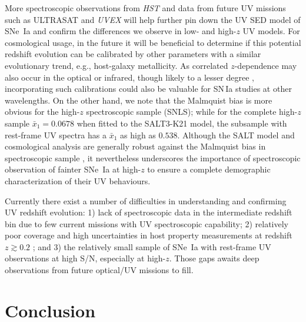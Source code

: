 \documentclass[twocolumn,tighten,times,floatfix]{aastex631}
\begin{document}
More spectroscopic observations from {\it HST} and data from future UV missions such as ULTRASAT and {\it UVEX} will help further pin down the UV SED model of SNe~Ia and confirm the differences we observe in low- and high-$z$ UV models. 
For cosmological usage, in the future it will be beneficial to determine if this potential redshift evolution can be calibrated by other parameters with a similar evolutionary trend, e.g., host-galaxy metallicity. As correlated $z$-dependence may also occur in the optical or infrared, though likely to a lesser degree \citep{Pierel24b, Pierel25}, incorporating such calibrations could also be valuable for SN\,Ia studies at other wavelengths.
On the other hand, we note that the Malmquist bias is more obvious for the high-$z$ spectroscopic sample (SNLS); while for the complete high-$z$ sample $\bar x_1=0.0678$ when fitted to the SALT3-K21 model, the subsample with rest-frame UV spectra has a $\bar x_1$ as high as $0.538$. 
Although the SALT model and cosmological analysis are generally robust against the Malmquist bias in spectroscopic sample \citep{Rubin16, Nicolas21, Ruppin25}, it nevertheless underscores the importance of spectroscopic observation of fainter SNe~Ia at high-$z$ to ensure a complete demographic characterization of their UV behaviours.



Currently there exist a number of difficulties in understanding and confirming UV redshift evolution: 1) lack of spectroscopic data in the intermediate redshift bin due to few current missions with UV spectroscopic capability; 2) relatively poor coverage and high uncertainties in host property measurements at redshift $z\gtrsim0.2$  \citep{Qin24}; and 3) the relatively small sample of SNe~Ia with rest-frame UV observations at high S/N, especially at high-$z$. Those gaps awaits deep observations from future optical/UV missions to fill.




\section{Conclusion} \label{sec:conclusion}
\end{document}
